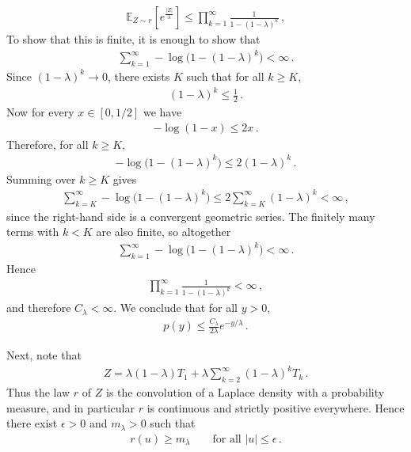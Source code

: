 \documentclass{article}
\theoremstyle{plain}
\theoremstyle{definition}
\theoremstyle{plain}
\newcommand{\E}{\mathbb E}
\begin{document}
\begin{align}
    \E_{Z \sim r} \left[e^{\frac{|Z|}{\lambda}}\right] \leq \prod_{k=1}^\infty \frac{1}{1 - (1-\lambda)^k}\,,
\end{align}
To show that this is finite, it is enough to show that
\begin{align}
    \sum_{k=1}^\infty -\log\bigl(1-(1-\lambda)^k\bigr) < \infty\,.
\end{align}
Since $(1-\lambda)^k \to 0$, there exists $K$ such that for all $k \ge K$,
\begin{align}
    (1-\lambda)^k \le \frac12\,.
\end{align}
Now for every $x \in [0,1/2]$ we have
\begin{align}
    -\log(1-x) \le 2x\,.
\end{align}
Therefore, for all $k \ge K$,
\begin{align}
    -\log\bigl(1-(1-\lambda)^k\bigr)
    \le 2(1-\lambda)^k\,.
\end{align}
Summing over $k \ge K$ gives
\begin{align}
    \sum_{k=K}^\infty -\log\bigl(1-(1-\lambda)^k\bigr)
    \le 2\sum_{k=K}^\infty (1-\lambda)^k < \infty\,,
\end{align}
since the right-hand side is a convergent geometric series. The finitely many terms with $k < K$ are also finite, so altogether
\begin{align}
    \sum_{k=1}^\infty -\log\bigl(1-(1-\lambda)^k\bigr) < \infty\,.
\end{align}
Hence
\begin{align}
    \prod_{k=1}^\infty \frac{1}{1-(1-\lambda)^k} < \infty\,,
\end{align}
and therefore $C_\lambda < \infty$. We conclude that for all $y>0$,
\begin{align}
    p(y) \le \frac{C_\lambda}{2\lambda} e^{-y/\lambda}\,.
\end{align}

Next, note that
\begin{align}
    Z = \lambda(1-\lambda)T_1 + \lambda\sum_{k=2}^\infty (1-\lambda)^k T_k\,.
\end{align}
Thus the law $r$ of $Z$ is the convolution of a Laplace density with a probability measure, and in particular $r$ is continuous and strictly positive everywhere. Hence there exist $\epsilon>0$ and $m_\lambda>0$ such that
\begin{align}
    r(u) \ge m_\lambda
    \qquad\text{for all } |u|\le \epsilon\,.
\end{align}
\end{document}
